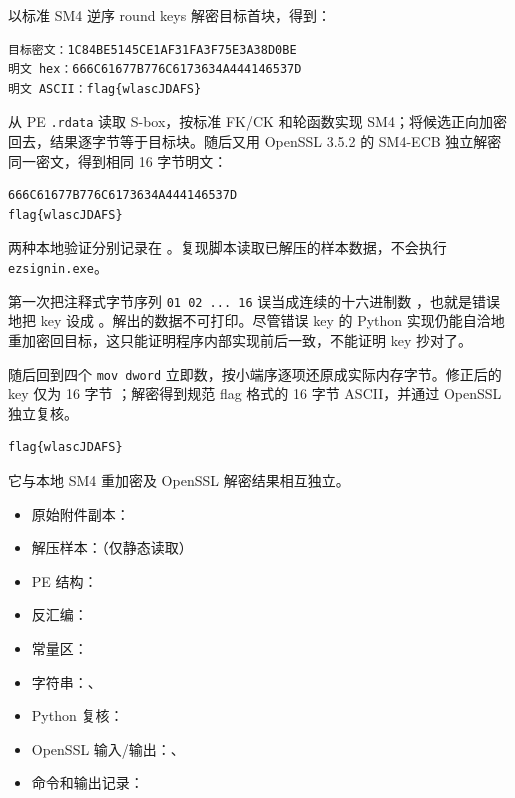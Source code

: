 以标准 SM4 逆序 round keys 解密目标首块，得到：

\begin{verbatim}
目标密文：1C84BE5145CE1AF31FA3F75E3A38D0BE
明文 hex：666C61677B776C6173634A444146537D
明文 ASCII：flag{wlascJDAFS}
\end{verbatim}

\texttt{} 从 PE \texttt{.rdata} 读取 S-box，按标准 FK/CK 和轮函数实现 SM4；将候选正向加密回去，结果逐字节等于目标块。随后又用 OpenSSL 3.5.2 的 SM4-ECB 独立解密同一密文，得到相同 16 字节明文：

\begin{verbatim}
666C61677B776C6173634A444146537D
flag{wlascJDAFS}
\end{verbatim}

两种本地验证分别记录在 \texttt{}。复现脚本读取已解压的样本数据，不会执行 \texttt{ezsignin.exe}。

第一次把注释式字节序列 \texttt{01\ 02\ ...\ 16} 误当成连续的十六进制数 \texttt{}，也就是错误地把 key 设成 \texttt{}。解出的数据不可打印。尽管错误 key 的 Python 实现仍能自洽地重加密回目标，这只能证明程序内部实现前后一致，不能证明 key 抄对了。

随后回到四个 \texttt{mov\ dword} 立即数，按小端序逐项还原成实际内存字节。修正后的 key 仅为 16 字节 \texttt{}；解密得到规范 flag 格式的 16 字节 ASCII，并通过 OpenSSL 独立复核。

\begin{verbatim}
flag{wlascJDAFS}
\end{verbatim}

它与本地 SM4 重加密及 OpenSSL 解密结果相互独立。

\begin{itemize}
\tightlist
\item
  原始附件副本：\texttt{}
\item
  解压样本：\texttt{}（仅静态读取）
\item
  PE 结构：\texttt{}
\item
  反汇编：\texttt{}
\item
  常量区：\texttt{}
\item
  字符串：\texttt{}、\texttt{}
\item
  Python 复核：\texttt{}
\item
  OpenSSL 输入/输出：\texttt{}、\texttt{}
\item
  命令和输出记录：\texttt{}
\end{itemize}

